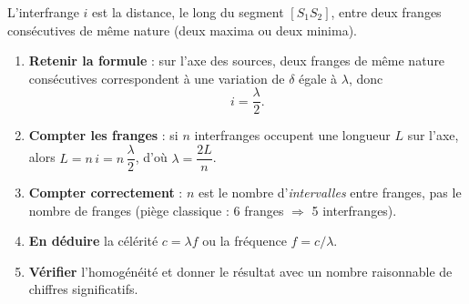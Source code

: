 \documentclass[11pt]{article}
\newcommand{\cle}[1]{{\popxbold\color{popdark}#1}}
\begin{document}
\begin{methode}
L'\cle{interfrange} $i$ est la distance, le long du segment $[S_1S_2]$, entre deux franges consécutives de même nature (deux maxima ou deux minima).
\begin{enumerate}
\item \textbf{Retenir la formule} : sur l'axe des sources, deux franges de même nature consécutives correspondent à une variation de $\delta$ égale à $\lambda$, donc
\[ i = \frac{\lambda}{2}. \]
\item \textbf{Compter les franges} : si $n$ interfranges occupent une longueur $L$ sur l'axe, alors $L = n\,i = n\,\dfrac{\lambda}{2}$, d'où $\lambda = \dfrac{2L}{n}$.
\item \textbf{Compter correctement} : $n$ est le nombre d'\emph{intervalles} entre franges, pas le nombre de franges (piège classique : 6 franges $\Rightarrow$ 5 interfranges).
\item \textbf{En déduire} la célérité $c = \lambda f$ ou la fréquence $f = c/\lambda$.
\item \textbf{Vérifier} l'homogénéité et donner le résultat avec un nombre raisonnable de chiffres significatifs.
\end{enumerate}
\end{methode}
\end{document}

